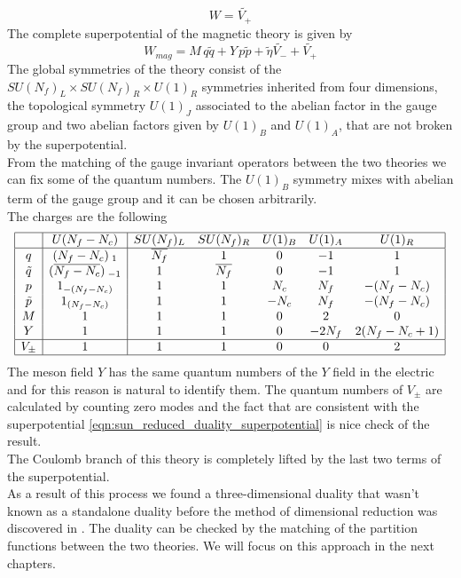 \begin{equation}
W = \tilde{V_+}
\end{equation}
The complete superpotential of the magnetic theory is given by
\begin{equation}
W_{mag} = M \, q \tilde{q} + Y \, p \tilde{p} + \tilde{\eta} \tilde{V_-} + \tilde{V_+}
\label{eqn:sun_reduced_duality_superpotential}
\end{equation}
The global symmetries of the theory consist of the $SU(N_f)_L \times SU(N_f)_R \times U(1)_R$ symmetries inherited from four dimensions, the topological symmetry $U(1)_J$ associated to the abelian factor in the gauge group and two abelian factors given by $U(1)_B$ and $U(1)_A$, that are not broken by the superpotential.\\
From the matching of the gauge invariant operators between the two theories we can fix some of the quantum numbers.
The $U(1)_B$ symmetry mixes with abelian term of the gauge group and it can be chosen arbitrarily.\\
The charges are the following
\begin{equation}
\begin{array} {| c | c | c c c c c |}
\hline
& U(N_f - N_c) & SU(N_f)_L & SU(N_f)_R & U(1)_B & U(1)_A & U(1)_R \\
\hline
q & (N_f - N_c)_{\; 1} & \overline{N_f} & 1 & 0 & -1 & 1 \\
\tilde{q} & (\overline{N_f - N_c})_{\;- 1} &   1& \overline{N_f} & 0 & -1 & 1 \\
p & 1_{-(N_f - N_c)} & 1 &  1 & N_c & N_f & -(N_f - N_c) \\
\tilde{p} & 1_{(N_f - N_c)} & 1 &  1 & - N_c & N_f & -(N_f - N_c) \\
M & 1 & 1 & 1 & 0 & 2 & 0 \\
Y & 1 & 1 & 1 & 0 & - 2 N_f & 2 (N_f - N_c+1)\\
\hline
V_{\pm} & 1 & 1 & 1 &0 & 0 &2\\
\hline
\end{array}
\end{equation}
The meson field $Y$ has the same quantum numbers of the $Y$ field in the electric and for this reason is natural to identify them.
The quantum numbers of $V_{\pm}$ are calculated by counting zero modes and the fact that are consistent with the superpotential \eqref{eqn:sun_reduced_duality_superpotential} is nice check of the result.\\
The Coulomb branch of this theory is completely lifted by the last two terms of the superpotential.\\
As a result of this process we found a three-dimensional duality that wasn't known as a standalone duality before the method of dimensional reduction was discovered in \cite{Aharony:2013dha}.
The duality can be checked by the matching of the partition functions between the two theories. 
We will focus on this approach in the next chapters. 
